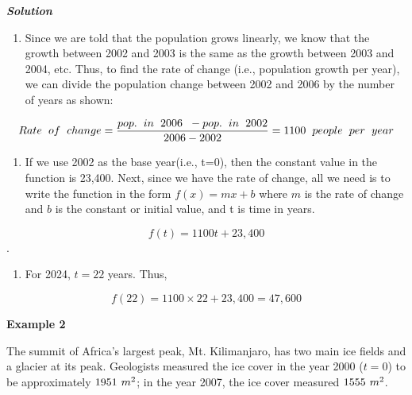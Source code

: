 \documentclass[
  letterpaper,
  DIV=11,
  numbers=noendperiod]{scrreprt}
\providecommand{\tightlist}{%
  \setlength{\itemsep}{0pt}\setlength{\parskip}{0pt}}\usepackage{longtable,booktabs,array}
\begin{document}
\textbf{\emph{Solution}}

\begin{enumerate}
\def\labelenumi{\alph{enumi})}
\tightlist
\item
  Since we are told that the population grows linearly, we know that the
  growth between 2002 and 2003 is the same as the growth between 2003
  and 2004, etc. Thus, to find the rate of change (i.e., population
  growth per year), we can divide the population change between 2002 and
  2006 by the number of years as shown:
\end{enumerate}

\[Rate\hspace{.08in} of\hspace{.08in} change =  \frac{pop. \hspace{.08in} in \hspace{.08in} 2006 \hspace{.08in}- pop. \hspace{.08in} in \hspace{.08in} 2002}{2006-2002}= 1100\hspace{.08in} people\hspace{.08in} per \hspace{.08in} year\]

\begin{enumerate}
\def\labelenumi{\alph{enumi})}
\setcounter{enumi}{1}
\tightlist
\item
  If we use 2002 as the base year(i.e., t=0), then the constant value in
  the function is 23,400. Next, since we have the rate of change, all we
  need is to write the function in the form \(f(x)=mx+b\) where \(m\) is
  the rate of change and \(b\) is the constant or initial value, and t
  is time in years.
\end{enumerate}

\[f(t) = 1100t+23,400\].

\begin{enumerate}
\def\labelenumi{\alph{enumi})}
\setcounter{enumi}{2}
\tightlist
\item
  For 2024, \(t=22\) years. Thus,
\end{enumerate}

\[f(22) = 1100\times22+23,400=47,600\]

\textbf{Example 2}

The summit of Africa's largest peak, Mt. Kilimanjaro, has two main ice
fields and a glacier at its peak. Geologists measured the ice cover in
the year 2000 (\(t = 0\)) to be approximately \(1951\hspace{.05in}m^2\);
in the year 2007, the ice cover measured \(1555 \hspace{.05in}m^2\).
\end{document}
